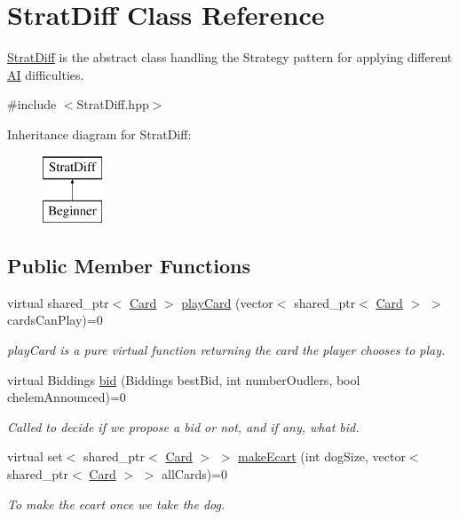 \hypertarget{classStratDiff}{\section{\-Strat\-Diff \-Class \-Reference}
\label{classStratDiff}
}


\hyperlink{classStratDiff}{\-Strat\-Diff} is the abstract class handling the \-Strategy pattern for applying different \hyperlink{classAI}{\-A\-I} difficulties.  




{\ttfamily \#include $<$\-Strat\-Diff.\-hpp$>$}

\-Inheritance diagram for \-Strat\-Diff\-:\begin{figure}[H]
\begin{center}
\leavevmode
\includegraphics[height=2.000000cm]{classStratDiff}
\end{center}
\end{figure}
\subsection*{\-Public \-Member \-Functions}
\begin{DoxyCompactItemize}
\item 
virtual shared\-\_\-ptr$<$ \hyperlink{classCard}{\-Card} $>$ \hyperlink{classStratDiff_a7882bac82aa02692bf5e6b33e9c4ae6c}{play\-Card} (vector$<$ shared\-\_\-ptr$<$ \hyperlink{classCard}{\-Card} $>$ $>$ cards\-Can\-Play)=0
\begin{DoxyCompactList}\small\item\em play\-Card is a pure virtual function returning the card the player chooses to play. \end{DoxyCompactList}\item 
virtual \-Biddings \hyperlink{classStratDiff_a84fc8f51747065234c9356895057008b}{bid} (\-Biddings best\-Bid, int number\-Oudlers, bool chelem\-Announced)=0
\begin{DoxyCompactList}\small\item\em \-Called to decide if we propose a bid or not, and if any, what bid. \end{DoxyCompactList}\item 
virtual set$<$ shared\-\_\-ptr$<$ \hyperlink{classCard}{\-Card} $>$ $>$ \hyperlink{classStratDiff_aec61f7e84d1376d41f13d044b3672226}{make\-Ecart} (int dog\-Size, vector$<$ shared\-\_\-ptr$<$ \hyperlink{classCard}{\-Card} $>$ $>$ all\-Cards)=0
\begin{DoxyCompactList}\small\item\em \-To make the ecart once we take the dog. \end{DoxyCompactList}\end{DoxyCompactItemize}


